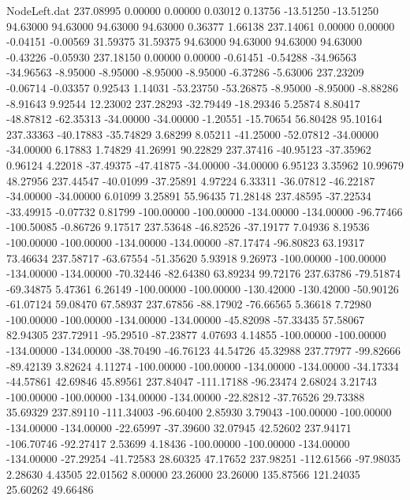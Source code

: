 \begin{filecontents}{NodeLeft.dat}
 237.08995    0.00000    0.00000     0.03012    0.13756  -13.51250  -13.51250   94.63000   94.63000   94.63000   94.63000    0.36377    1.66138
 237.14061    0.00000    0.00000    -0.04151   -0.00569   31.59375   31.59375   94.63000   94.63000   94.63000   94.63000   -0.43226   -0.05930
 237.18150    0.00000    0.00000    -0.61451   -0.54288  -34.96563  -34.96563   -8.95000   -8.95000   -8.95000   -8.95000   -6.37286   -5.63006
 237.23209   -0.06714   -0.03357     0.92543    1.14031  -53.23750  -53.26875   -8.95000   -8.95000   -8.88286   -8.91643    9.92544   12.23002
 237.28293  -32.79449  -18.29346     5.25874    8.80417  -48.87812  -62.35313  -34.00000  -34.00000   -1.20551  -15.70654   56.80428   95.10164
 237.33363  -40.17883  -35.74829     3.68299    8.05211  -41.25000  -52.07812  -34.00000  -34.00000    6.17883    1.74829   41.26991   90.22829
 237.37416  -40.95123  -37.35962     0.96124    4.22018  -37.49375  -47.41875  -34.00000  -34.00000    6.95123    3.35962   10.99679   48.27956
 237.44547  -40.01099  -37.25891     4.97224    6.33311  -36.07812  -46.22187  -34.00000  -34.00000    6.01099    3.25891   55.96435   71.28148
 237.48595  -37.22534  -33.49915    -0.07732    0.81799 -100.00000 -100.00000 -134.00000 -134.00000  -96.77466 -100.50085   -0.86726    9.17517
 237.53648  -46.82526  -37.19177     7.04936    8.19536 -100.00000 -100.00000 -134.00000 -134.00000  -87.17474  -96.80823   63.19317   73.46634
 237.58717  -63.67554  -51.35620     5.93918    9.26973 -100.00000 -100.00000 -134.00000 -134.00000  -70.32446  -82.64380   63.89234   99.72176
 237.63786  -79.51874  -69.34875     5.47361    6.26149 -100.00000 -100.00000 -130.42000 -130.42000  -50.90126  -61.07124   59.08470   67.58937
 237.67856  -88.17902  -76.66565     5.36618    7.72980 -100.00000 -100.00000 -134.00000 -134.00000  -45.82098  -57.33435   57.58067   82.94305
 237.72911  -95.29510  -87.23877     4.07693    4.14855 -100.00000 -100.00000 -134.00000 -134.00000  -38.70490  -46.76123   44.54726   45.32988
 237.77977  -99.82666  -89.42139     3.82624    4.11274 -100.00000 -100.00000 -134.00000 -134.00000  -34.17334  -44.57861   42.69846   45.89561
 237.84047 -111.17188  -96.23474     2.68024    3.21743 -100.00000 -100.00000 -134.00000 -134.00000  -22.82812  -37.76526   29.73388   35.69329
 237.89110 -111.34003  -96.60400     2.85930    3.79043 -100.00000 -100.00000 -134.00000 -134.00000  -22.65997  -37.39600   32.07945   42.52602
 237.94171 -106.70746  -92.27417     2.53699    4.18436 -100.00000 -100.00000 -134.00000 -134.00000  -27.29254  -41.72583   28.60325   47.17652
 237.98251 -112.61566  -97.98035     2.28630    4.43505   22.01562    8.00000   23.26000   23.26000  135.87566  121.24035   25.60262   49.66486

\end{filecontents}

